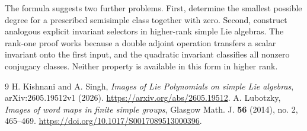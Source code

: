\documentclass[11pt]{article}
\begin{document}
The formula suggests two further problems. First, determine the smallest
possible degree for a prescribed semisimple class together with zero.
Second, construct analogous explicit invariant selectors in higher-rank
simple Lie algebras. The rank-one proof works because a double adjoint
operation transfers a scalar invariant onto the first input, and the
quadratic invariant classifies all nonzero conjugacy classes. Neither
property is available in this form in higher rank.

\begin{thebibliography}{9}
H. Kishnani and A. Singh,
\emph{Images of Lie Polynomials on simple Lie algebras},
arXiv:2605.19512v1 (2026).
\url{https://arxiv.org/abs/2605.19512}.
A. Lubotzky,
\emph{Images of word maps in finite simple groups},
Glasgow Math. J. \textbf{56} (2014), no. 2, 465--469.
\url{https://doi.org/10.1017/S0017089513000396}.
\end{thebibliography}
\end{document}
